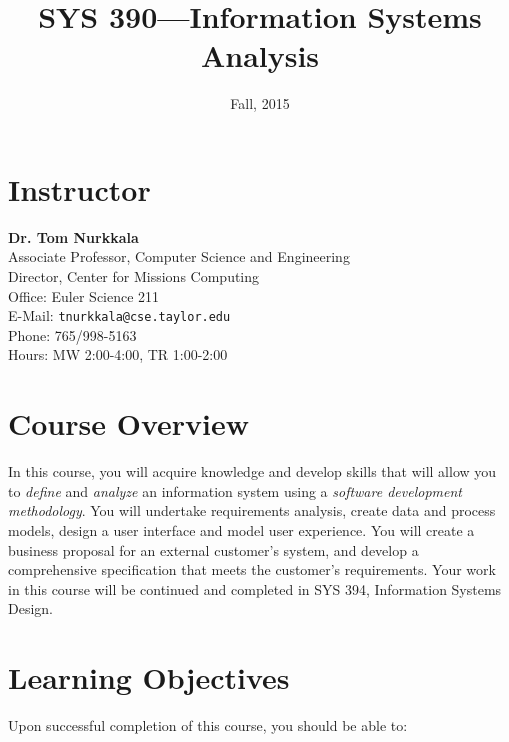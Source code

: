 \documentclass{article}
\date{Fall, 2015}
\title{SYS 390---Information Systems Analysis}
\renewcommand\maketitle\relax
\begin{document}
\maketitle

\section{Instructor}
\label{sec:orgheadline1}
\textbf{Dr. Tom Nurkkala}\\
Associate Professor, Computer Science and Engineering\\
Director, Center for Missions Computing\\
Office: Euler Science 211\\
E-Mail: \texttt{tnurkkala@cse.taylor.edu}\\
Phone: 765/998-5163\\
Hours: MW 2:00-4:00, TR 1:00-2:00

\section{Course Overview}
\label{sec:orgheadline2}
In this course, you will acquire knowledge and develop skills
that will allow you to \emph{define} and \emph{analyze} an information system
using a \emph{software development methodology}.
You will
undertake requirements analysis,
create data and process models,
design a user interface
and model user experience.
You will create a business proposal for an external customer's system,
and develop a comprehensive specification that meets the customer's requirements.
Your work in this course will be continued and completed in
SYS 394, Information Systems Design.

\section{Learning Objectives}
\label{sec:orgheadline3}
Upon successful completion of this course, you should be able to:
\end{document}
